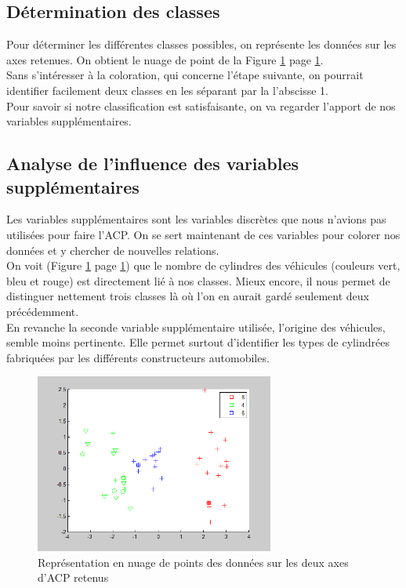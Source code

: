 \documentclass[11pt,oneside]{article}
\begin{document}
\subsection{Détermination des classes}
Pour déterminer les différentes classes possibles, on représente les données sur les axes retenues. On obtient le nuage de point de la Figure \ref{img:nuagePoint} page \ref{img:nuagePoint}.\\
Sans s'intéresser à la coloration, qui concerne l'étape suivante, on pourrait identifier facilement deux classes en les séparant par la l'abscisse 1.\\
Pour savoir si notre classification est satisfaisante, on va regarder l'apport de nos variables supplémentaires.\\ 

\subsection{Analyse de l'influence des variables supplémentaires}
Les variables supplémentaires sont les variables discrètes que nous n'avions pas utilisées pour faire l'ACP. On se sert maintenant de ces variables pour colorer nos données et y chercher de nouvelles relations.\\
On voit (Figure \ref{img:nuagePoint} page \ref{img:nuagePoint}) que le nombre de cylindres des véhicules (couleurs vert, bleu et rouge) est directement lié à nos classes. Mieux encore, il nous permet de distinguer nettement trois classes là où l'on en aurait gardé seulement deux précédemment.\\

En revanche la seconde variable supplémentaire utilisée, l'origine des véhicules, semble moins pertinente. Elle permet surtout d'identifier les types de cylindrées fabriquées par les différents constructeurs automobiles.\\

\begin{figure}
	\begin{center}
	\includegraphics[width=0.7\textwidth]{Images/NuagePoint}
	\caption{Représentation en nuage de points des données sur les deux axes d'ACP retenus}\label{img:nuagePoint}
	  \end{center}
\end{figure}
\FloatBarrier
\end{document}
